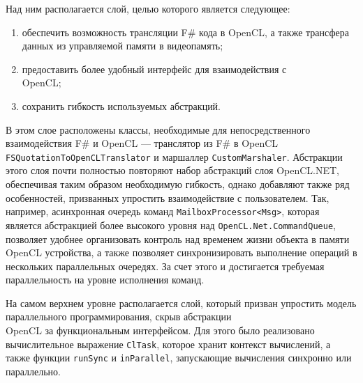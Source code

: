 Над ним располагается слой, целью которого является следующее:
\begin{enumerate}
    \item обеспечить возможность трансляции F\# кода в OpenCL, а также трансфера данных из управляемой памяти в видеопамять;
    \item предоставить более удобный интерфейс для взаимодействия с \\ OpenCL;
    \item сохранить гибкость используемых абстракций.
\end{enumerate}
В этом слое расположены классы, необходимые для непосредственного взаимодействия F\# и OpenCL --- транслятор из F\# в OpenCL \verb|FSQuotationToOpenCLTranslator| и маршаллер \verb|CustomMarshaler|. Абстракции этого слоя почти полностью повторяют набор абстракций слоя OpenCL.NET, обеспечивая таким образом необходимую гибкость, однако добавляют также ряд особенностей, призванных упростить взаимодействие с пользователем. Так, например, асинхронная очередь команд \verb|MailboxProcessor<Msg>|, которая является абстракцией более высокого уровня над \verb|OpenCL.Net.CommandQueue|, позволяет удобнее организовать контроль над временем жизни объекта в памяти OpenCL устройства, а также позволяет синхронизировать выполнение операций в нескольких параллельных очередях. За счет этого и достигается требуемая параллельность на уровне исполнения команд.

На самом верхнем уровне располагается слой, который призван упростить модель параллельного программирования, скрыв абстракции \\ OpenCL за функциональным интерфейсом. Для этого было реализовано вычислительное выражение \verb|ClTask|, которое хранит контекст вычислений, а также функции \verb|runSync| и \verb|inParallel|, запускающие вычисления синхронно или параллельно.

